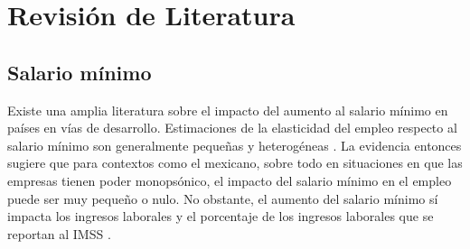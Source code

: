 \chapter{Revisión de Literatura}
\label{ch:relatedwork}


\section{Salario mínimo}

\noindent Existe una amplia literatura sobre el impacto del aumento al salario mínimo en países en vías de desarrollo. Estimaciones de la elasticidad del empleo respecto al salario mínimo son generalmente pequeñas y heterogéneas \citep{neumark_2019}. La evidencia entonces sugiere que para contextos como el mexicano, sobre todo en situaciones en que las empresas tienen poder monopsónico, el impacto del salario mínimo en el empleo puede ser muy pequeño o nulo. No obstante, el aumento del salario mínimo sí impacta los ingresos laborales y el porcentaje de los ingresos laborales que se reportan al IMSS \citep{munguia_2020}. 


 
 


